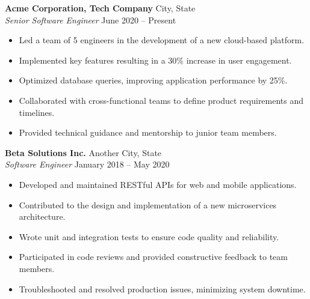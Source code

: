 \documentclass[a4paper,10pt]{article}
\begin{document}

\textbf{Acme Corporation, Tech Company} \hfill City, State \\
\emph{Senior Software Engineer} \hfill June 2020 -- Present
\begin{itemize}
    \item Led a team of 5 engineers in the development of a new cloud-based platform.
    \item Implemented key features resulting in a 30\% increase in user engagement.
    \item Optimized database queries, improving application performance by 25\%.
    \item Collaborated with cross-functional teams to define product requirements and timelines.
    \item Provided technical guidance and mentorship to junior team members.
\end{itemize}

\textbf{Beta Solutions Inc.} \hfill Another City, State \\
\emph{Software Engineer} \hfill January 2018 -- May 2020
\begin{itemize}
    \item Developed and maintained RESTful APIs for web and mobile applications.
    \item Contributed to the design and implementation of a new microservices architecture.
    \item Wrote unit and integration tests to ensure code quality and reliability.
    \item Participated in code reviews and provided constructive feedback to team members.
    \item Troubleshooted and resolved production issues, minimizing system downtime.
\end{itemize}

\end{document}
